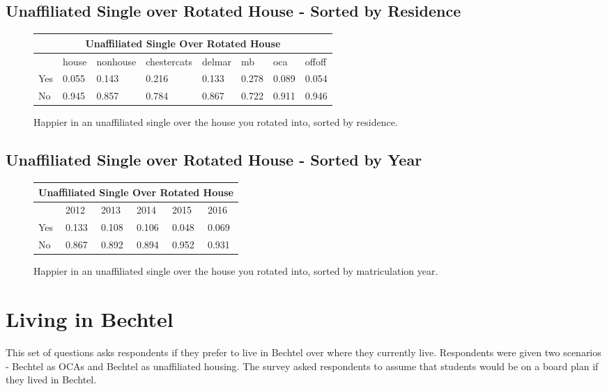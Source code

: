 \documentclass[12pt]{article} %
\begin{document}
\subsection{Unaffiliated Single over Rotated House - Sorted by Residence}
\begin{figure}[H]
	\begin{center}
\begin{tabular}{|m{1.3 cm}|m{1.3 cm}|m{1.8 cm}|m{2.3 cm}|m{1.3 cm}|m{1.3 cm}|m{1.3 cm}|m{1.3 cm} |}
\hline
\multicolumn{8}{|c|}{Unaffiliated Single Over Rotated House}\\ \hline
& house& nonhouse& chestercats& delmar& mb& oca& offoff\\ \hline
Yes   &  0.055 &  0.143 &  0.216 &  0.133 &  0.278 &  0.089 &  0.054\\ \hline
No   &  0.945 &  0.857 &  0.784 &  0.867 &  0.722 &  0.911 &  0.946\\ \hline
\end{tabular}
\end{center}
	\caption{Happier in an unaffiliated single over the house you rotated into, sorted by residence.}
\end{figure}

\subsection{Unaffiliated Single over Rotated House - Sorted by Year}
\begin{figure}[H]
	\begin{center}
\begin{tabular}{|m{1.3 cm}|m{1.3 cm}|m{1.3 cm}|m{1.3 cm}|m{1.3 cm}|m{1.3 cm} |}
\hline
\multicolumn{6}{|c|}{Unaffiliated Single Over Rotated House}\\ \hline
& 2012& 2013& 2014& 2015& 2016\\ \hline
Yes   &  0.133 &  0.108 &  0.106 &  0.048 &  0.069\\ \hline
No   &  0.867 &  0.892 &  0.894 &  0.952 &  0.931\\ \hline
\end{tabular}
\end{center}
	\caption{Happier in an unaffiliated single over the house you rotated into, sorted by matriculation year.}
\end{figure}
\newpage
\section{Living in Bechtel}
This set of questions asks respondents if they prefer to live in Bechtel over where they currently live. Respondents were given two scenarios - Bechtel as OCAs and Bechtel as unaffiliated housing. The survey asked respondents to assume that students would be on a board plan if they lived in Bechtel.
\end{document}
